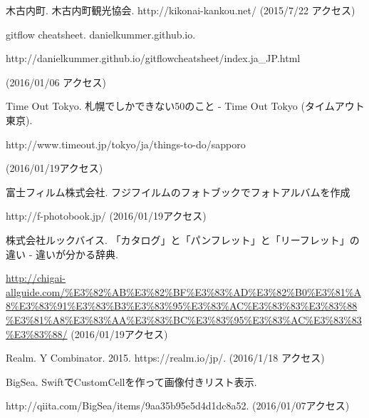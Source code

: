 \documentclass[openany,11pt,papersize]{jsbook}
\begin{document}
\begin{thebibliography}{99}

木古内町. 木古内町観光協会. http://kikonai-kankou.net/ (2015/7/22 アクセス)

gitflow cheatsheet. danielkummer.github.io. \par
http://danielkummer.github.io/gitflowcheatsheet/index.ja\_JP.html \par
(2016/01/06 アクセス)

Time Out Tokyo. 札幌でしかできない50のこと - Time Out Tokyo (タイムアウト東京). \par
http://www.timeout.jp/tokyo/ja/things-to-do/sapporo \par
(2016/01/19アクセス)

富士フィルム株式会社. フジフイルムのフォトブックでフォトアルバムを作成 \par
http://f-photobook.jp/ (2016/01/19アクセス)

株式会社ルックバイス. 「カタログ」と「パンフレット」と「リーフレット」の違い - 違いが分かる辞典. \par
\url{http://chigai-allguide.com/%E3%82%AB%E3%82%BF%E3%83%AD%E3%82%B0%E3%81%A8%E3%83%91%E3%83%B3%E3%83%95%E3%83%AC%E3%83%83%E3%83%88%E3%81%A8%E3%83%AA%E3%83%BC%E3%83%95%E3%83%AC%E3%83%83%E3%83%88/} 
(2016/01/19アクセス)

Realm. Y Combinator. 2015. https://realm.io/jp/. (2016/1/18 アクセス)

BigSea. SwiftでCustomCellを作って画像付きリスト表示. \par
http://qiita.com/BigSea/items/9aa35b95e5d4d1dc8a52. (2016/01/07アクセス)

\end{thebibliography}
\end{document}
